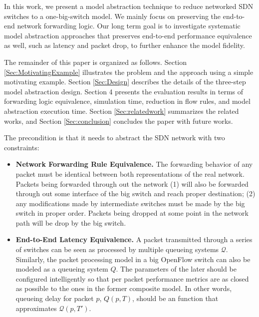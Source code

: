 In this work, we present a model abstraction technique to reduce networked SDN switches to a one-big-switch model. We mainly focus on preserving the end-to-end network forwarding logic. Our long term goal is to investigate systematic model abstraction approaches that preserves end-to-end performance equivalence as well, such as latency and packet drop, to further enhance the model fidelity. 

The remainder of this paper is organized as follows. Section  \ref{Sec:MotivatingExample} illustrates the problem and the approach using a simple motivating example. Section \ref{Sec:Design} describes the details of the three-step model abstraction design. Section 4 presents the evaluation results in terms of forwarding logic equivalence, simulation time, reduction in flow rules, and model abstraction execution time. Section \ref{Sec:relatedwork} summarizes the related works, and Section \ref{Sec:conclusion} concludes the paper with future works. 


The precondition is that it needs to abstract the SDN network with two constraints:
\begin{itemize}
\item \textbf{Network Forwarding Rule Equivalence.}
        The forwarding behavior of any packet must be identical
        between both representations of the real network. Packets being
        forwarded through out the network (1) will also be forwarded through out
        some interface of the big switch and reach proper destination;
        (2) any modifications made by intermediate switches must be made by the
        big switch in proper order.
        Packets being dropped at some point in the network path will be drop by the
        big switch.
\item \textbf{End-to-End Latency Equivalence.}
        A packet transmitted through a series of
        switches can be seen as processed by multiple queueing systems $\mathcal{Q}$.
        Similarly, the packet processing model in a big OpenFlow switch can
        also be modeled as a queueing system $Q$.
        The parameters of the later should be configured intelligently
        so that per packet performance metrics are as closed as possible to the ones
        in the former composite model.
        In other words, queueing delay for packet $p$, $Q(p, T)$, should be an
        function that approximates $\mathcal{Q}(p, T')$.
\end{itemize}
\fi




